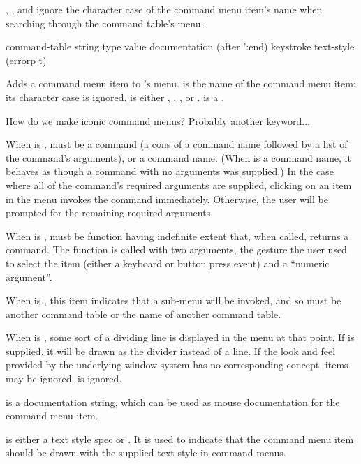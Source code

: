 , ,
and  ignore the character case of the command menu item's
name when searching through the command table's menu.


 {command-table string type value
                                         \key documentation (after ':end) keystroke
                                              text-style (errorp t)}

Adds a command menu item to 's menu.   is the
name of the command menu item; its character case is ignored.   is
either , , , or .
 is a .

 {How do we make iconic command menus?  Probably another keyword...}

When  is ,  must be a command (a cons of a
command name followed by a list of the command's arguments), or a command name.
(When  is a command name, it behaves as though a command with no
arguments was supplied.)  In the case where all of the command's required
arguments are supplied, clicking on an item in the menu invokes the command
immediately.  Otherwise, the user will be prompted for the remaining required
arguments.

When  is ,  must be function having
indefinite extent that, when called, returns a command.  The function is called
with two arguments, the gesture the user used to select the item (either a
keyboard or button press event) and a ``numeric argument''.

When  is , this item indicates that a sub-menu will be
invoked, and so  must be another command table or the name of
another command table.

When  is , some sort of a dividing line is displayed in
the menu at that point.  If  is supplied, it will be drawn as the
divider instead of a line.  If the look and feel provided by the underlying
window system has no corresponding concept,  items may be ignored.
 is ignored.

 is a documentation string, which can be used as mouse
documentation for the command menu item.

 is either a text style spec or .  It is used to
indicate that the command menu item should be drawn with the supplied text style
in command menus.

